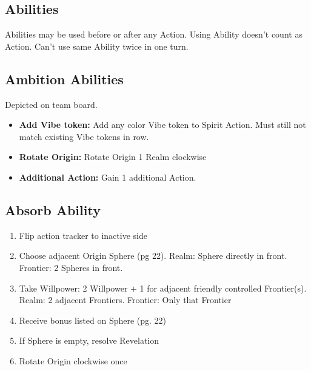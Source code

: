\documentclass[10pt]{article}
\newenvironment{enumerateCustom}
{\begin{enumerate}
  \setlength{\itemsep}{1pt}
  \setlength{\parskip}{0pt}
  \setlength{\parsep}{0pt}}
{\end{enumerate}}
\newenvironment{itemizeCustom}
{\begin{itemize}
  \setlength{\itemsep}{1pt}
  \setlength{\parskip}{0pt}
  \setlength{\parsep}{0pt}}
{\end{itemize}}
\begin{document}
\begin{multicols*}{2}
\section*{Abilities}
Abilities may be used before or after any Action. Using Ability doesn't count as Action. Can't use same Ability twice in one turn.

\subsection*{Ambition Abilities}
Depicted on team board.

\begin{itemizeCustom}
    \item \textbf{Add Vibe token:} Add any color Vibe token to Spirit Action. Must still not match existing Vibe tokens in row.
    \item \textbf{Rotate Origin:} Rotate Origin 1 Realm clockwise
    \item \textbf{Additional Action:} Gain 1 additional Action.
\end{itemizeCustom}

\subsection*{Absorb Ability}
\begin{enumerateCustom}
    \item Flip action tracker to inactive side
    \item Choose adjacent Origin Sphere (pg 22). Realm: Sphere directly in front. Frontier: 2 Spheres in front.
    \item Take Willpower: 2 Willpower $+$ 1 for adjacent friendly controlled Frontier(s). Realm: 2 adjacent Frontiers. Frontier: Only that Frontier
    \item Receive bonus listed on Sphere (pg. 22)
    \item If Sphere is empty, resolve Revelation
    \item Rotate Origin clockwise once
\end{enumerateCustom}


\end{multicols*}
\end{document}
